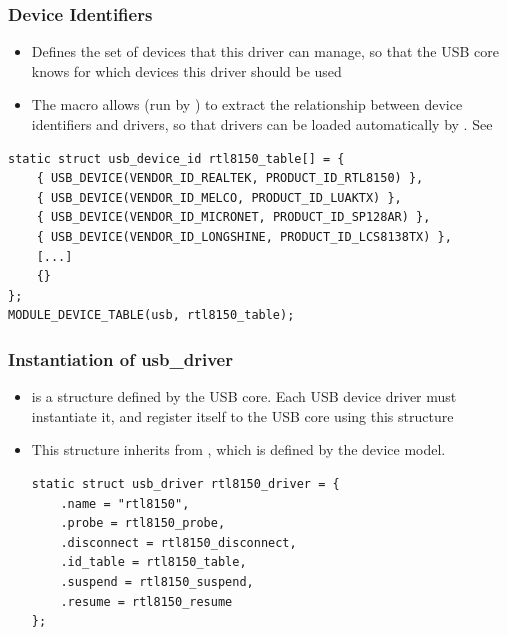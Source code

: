 \begin{frame}[fragile]
  \frametitle{Device Identifiers}
  \begin{itemize}
  \item Defines the set of devices that this driver can manage, so
    that the USB core knows for which devices this driver should be
    used
  \item The  macro allows 
    (run by ) to extract the relationship
    between device identifiers and drivers, so that drivers can be
    loaded automatically by .
    See 
  \end{itemize}
  \begin{block}{}
  \begin{verbatim}
static struct usb_device_id rtl8150_table[] = {
    { USB_DEVICE(VENDOR_ID_REALTEK, PRODUCT_ID_RTL8150) },
    { USB_DEVICE(VENDOR_ID_MELCO, PRODUCT_ID_LUAKTX) },
    { USB_DEVICE(VENDOR_ID_MICRONET, PRODUCT_ID_SP128AR) },
    { USB_DEVICE(VENDOR_ID_LONGSHINE, PRODUCT_ID_LCS8138TX) },
    [...]
    {}
};
MODULE_DEVICE_TABLE(usb, rtl8150_table);
  \end{verbatim}
  \end{block}
\end{frame}

\begin{frame}[fragile]
  \frametitle{Instantiation of usb\_driver}
  \begin{itemize}
  \item {} is a structure defined by the USB
    core. Each USB device driver must instantiate it, and register
    itself to the USB core using this structure
  \item This structure inherits from ,
    which is defined by the device model.
    \begin{block}{}
  \begin{verbatim}
static struct usb_driver rtl8150_driver = {
    .name = "rtl8150",
    .probe = rtl8150_probe,
    .disconnect = rtl8150_disconnect,
    .id_table = rtl8150_table,
    .suspend = rtl8150_suspend,
    .resume = rtl8150_resume
};
  \end{verbatim}
  \end{block}
  \end{itemize}
\end{frame}

